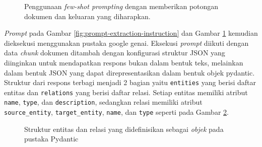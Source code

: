 \begin{figure}[H]
	\centering
	\caption{
		Penggunaan \textit{few-shot prompting} dengan memberikan potongan dokumen dan keluaran yang diharapkan.
	}
	\label{fig:prompt-extraction-few-shot}
\end{figure}

\textit{Prompt} pada Gambar \ref{fig:prompt-extraction-instruction} dan Gambar \ref{fig:prompt-extraction-few-shot} kemudian dieksekusi menggunakan pustaka google genai.
Eksekusi \textit{prompt} diikuti dengan data \textit{chunk} dokumen ditambah dengan konfigurasi struktur JSON yang diinginkan untuk mendapatkan respons bukan dalam bentuk teks, melainkan dalam bentuk JSON yang dapat direpresentasikan dalam bentuk objek pydantic.
Struktur dari respons terbagi menjadi 2 bagian yaitu \texttt{entities} yang berisi daftar entitas dan \texttt{relations} yang berisi daftar relasi.
Setiap entitas memiliki atribut \texttt{name}, \texttt{type}, dan \texttt{description}, sedangkan relasi memiliki atribut \\
\texttt{source\_entity}, \texttt{target\_entity}, \texttt{name}, dan \texttt{type} seperti pada Gambar \ref{fig:entity-relation-structure}.

\begin{figure}[H]
	\centering
	\caption{
		Struktur entitas dan relasi yang didefinisikan sebagai \textit{objek} pada pustaka Pydantic
	}
	\label{fig:entity-relation-structure}
\end{figure}

